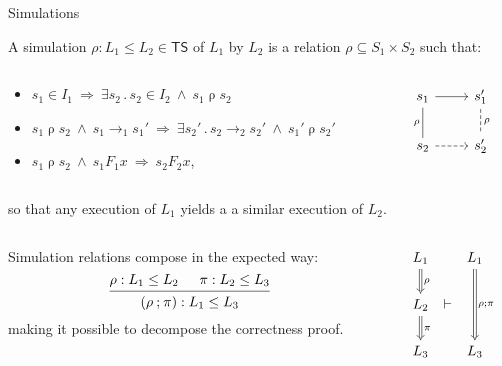 \documentclass[aspectratio=1610,12pt]{beamer}
\begin{document}
\begin{frame}[fragile]{Simulations} %

  A simulation $\rho : L_1 \le L_2 \in \mathsf{TS}$ of $L_1$ by $L_2$
  is a relation $\rho \subseteq S_1 \times S_2$ such that:
  \vspace{-1ex}
  \begin{columns}
    \begin{column}{.68\textwidth}
      \begin{itemize}
        \item $s_1 \in I_1 \:\Rightarrow\: \exists s_2 \mathbin.
          s_2 \in I_2 \:\wedge\: s_1 \mathrel{\rho} s_2$
        \item $s_1 \mathrel{\rho} s_2 \:\wedge\: s_1 \rightarrow_1 s_1'
          \:\Rightarrow\: \exists s_2' \mathbin.
            s_2 \rightarrow_2 s_2' \:\wedge\: s_1' \mathrel{\rho} s_2'$
        \item $s_1 \mathrel{\rho} s_2 \:\wedge\: s_1 \mathrel{F_1} x
          \:\Rightarrow\: s_2 \mathrel{F_2} x$,
      \end{itemize}
    \end{column}
    \begin{column}{.25\textwidth}
      \[
      \begin{tikzcd}
        s_1 \ar[d,"\rho"',dash] \ar[r] & s_1' \ar[d,dashed,dash,"\rho"] \\
        s_2 \ar[r,dashed] & s_2'
      \end{tikzcd}
      \]
    \end{column}
  \end{columns}
  \vspace{1ex}
  so that any execution of $L_1$ yields a
  a similar execution of $L_2$.

  \begin{columns}
    \begin{column}{.68\textwidth}
  Simulation relations compose in the expected way:
  \[
    \begin{prooftree}
      \hypo{\rho : L_1 \le L_2}
      \hypo{\pi : L_2 \le L_3}
      \infer2{(\rho \mathbin; \pi) : L_1 \le L_3}
    \end{prooftree}
  \]
  making it possible to decompose the correctness proof.
    \end{column}
    \begin{column}{.25\textwidth}
      \[
        \begin{tikzcd}[column sep=0.5ex]
          L_1 \ar[d, Rightarrow, "\rho"] &&
          L_1 \ar[dd, Rightarrow, "\rho \mathbin; \pi"] \\
          L_2 \ar[d, Rightarrow, "\pi"] & \vdash \\
          L_3 && L_3
        \end{tikzcd}
      \]
    \end{column}
  \end{columns}
\end{frame}
\end{document}
